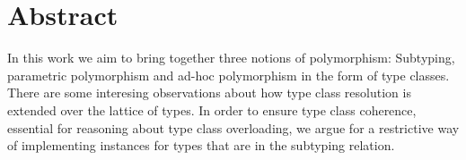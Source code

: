 \documentclass[twoside,12pt,a4paper]{report}
\begin{document}

\setcounter{page}{1}



\section*{Abstract}

In this work we aim to bring together three notions of polymorphism:
Subtyping, parametric polymorphism and ad-hoc polymorphism in the form  of type classes.
There are some interesing observations about how type class resolution is extended over the lattice of types.
In order to ensure type class coherence, essential for reasoning about type class overloading, we argue for a restrictive way of implementing instances for types that are in the subtyping relation.



\cleardoublepage


\renewcommand{\baselinestretch}{1.3}
\small\normalsize

\tableofcontents

\renewcommand{\baselinestretch}{1}
\small\normalsize

\cleardoublepage


\setcounter{page}{1}


\cleardoublepage


\cleardoublepage
\end{document}
